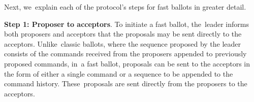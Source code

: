 \documentclass[algorithms,article,accept,moreauthors,pdftex,10pt,a4paper]{Definitions/mdpi}
\begin{document}
Next, we~explain each of the protocol's steps for fast ballots in greater detail.

{\bf Step 1: Proposer to acceptors}.
To initiate a fast ballot, the~leader informs both proposers and acceptors that the proposals may be sent directly to the acceptors. Unlike~classic ballots, where the sequence proposed by the leader consists of the commands received from the proposers appended to previously proposed commands, in~a fast ballot, proposals can be sent to the acceptors in the form of either a single command or a sequence to be appended to the command history. These~proposals are sent directly from the proposers to the acceptors.
\end{document}
